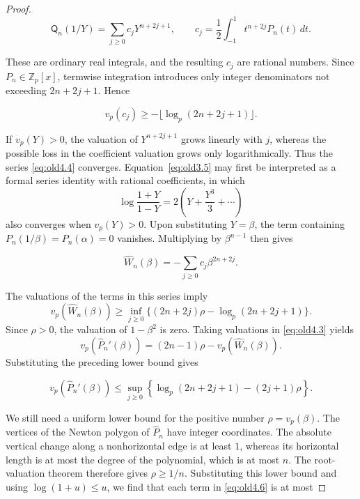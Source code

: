 \documentclass[11pt,a4paper]{article}
\numberwithin{equation}{section}
\theoremstyle{definition}
\begin{document}
\begin{proof}
\begin{equation}
\mathsf Q_n(1/Y)=\sum_{j\ge0}c_jY^{n+2j+1},\qquad
c_j=\frac12\int_{-1}^1t^{n+2j}P_n(t)\,dt.
\label{eq:old4.4}
\end{equation}

These are ordinary real integrals, and the resulting \(c_j\) are rational numbers. Since \(P_n\in\mathbb Z_p[x]\), termwise integration introduces only integer denominators not exceeding \(2n+2j+1\). Hence

\begin{equation}
v_p(c_j)\ge-\lfloor\log_p(2n+2j+1)\rfloor.
\label{eq:old4.5}
\end{equation}

If \(v_p(Y)>0\), the valuation of \(Y^{n+2j+1}\) grows linearly with \(j\), whereas the possible loss in the coefficient valuation grows only logarithmically. Thus the series \eqref{eq:old4.4} converges. Equation~\eqref{eq:old3.5} may first be interpreted as a formal series identity with rational coefficients, in which
\[
\log\frac{1+Y}{1-Y}=2\left(Y+\frac{Y^3}{3}+\cdots\right)
\]
also converges when \(v_p(Y)>0\). Upon substituting \(Y=\beta\), the term containing \(P_n(1/\beta)=P_n(\alpha)=0\) vanishes. Multiplying by \(\beta^{n-1}\) then gives

\[
\widehat W_n(\beta)
=-\sum_{j\ge0}c_j\beta^{2n+2j}.
\]

The valuations of the terms in this series imply
\[
v_p(\widehat W_n(\beta))
\ge\inf_{j\ge0}\bigl\{(2n+2j)\rho-\log_p(2n+2j+1)\bigr\}.
\]
Since \(\rho>0\), the valuation of \(1-\beta^2\) is zero. Taking valuations in \eqref{eq:old4.3} yields
\[
v_p(\widehat P_n'(\beta))
=(2n-1)\rho-v_p(\widehat W_n(\beta)).
\]
Substituting the preceding lower bound gives

\begin{equation}
v_p(\widehat P_n'(\beta))
\le\sup_{j\ge0}\left\{\log_p(2n+2j+1)-(2j+1)\rho\right\}.
\label{eq:old4.6}
\end{equation}

We still need a uniform lower bound for the positive number \(\rho=v_p(\beta)\). The vertices of the Newton polygon of \(\widehat P_n\) have integer coordinates. The absolute vertical change along a nonhorizontal edge is at least \(1\), whereas its horizontal length is at most the degree of the polynomial, which is at most \(n\). The root-valuation theorem therefore gives \(\rho\ge1/n\). Substituting this lower bound and using \(\log(1+u)\le u\), we find that each term in \eqref{eq:old4.6} is at most


\end{proof}
\end{document}
